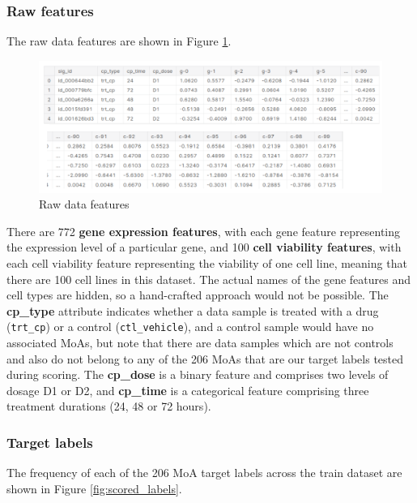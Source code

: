 \documentclass{article}
\begin{document}
\subsubsection{Raw features}
The raw data features are shown in Figure \ref{fig:raw_data}. 

\begin{figure}[H]
\begin{center}
	\includegraphics[width=1\textwidth]{pics/raw_data.png}
    \caption{Raw data features}
\label{fig:raw_data}
\end{center}
\end{figure}

There are 772 \textbf{gene expression features}, with each gene feature representing the expression level of a particular gene, and 100 \textbf{cell viability features}, with each cell viability feature representing the viability of one cell line, meaning that there are 100 cell lines in this dataset. The actual names of the gene features and cell types are hidden, so a hand-crafted approach would not be possible. The \textbf{cp\_type} attribute indicates whether a data sample is treated with a drug (\texttt{trt\_cp}) or a control (\texttt{ctl\_vehicle}), and a control sample would have no associated MoAs, but note that there are data samples which are not controls and also do not belong to any of the 206 MoAs that are our target labels tested during scoring. The \textbf{cp\_dose} is a binary feature and comprises two levels of dosage D1 or D2, and \textbf{cp\_time} is a categorical feature comprising three treatment durations (24, 48 or 72 hours). 

\subsubsection{Target labels}
The frequency of each of the 206 MoA target labels across the train dataset are shown in Figure \ref{fig:scored_labels}. 
\end{document}
